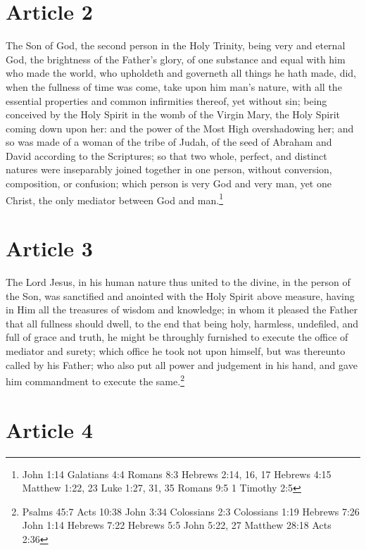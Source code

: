 \documentclass[12pt,letterpaper]{book}
\begin{document}
\section{Article 2}

The Son of God, the second person in the Holy Trinity, being very and eternal God, the brightness of the Father's glory, of one substance and equal with him who made the world, who upholdeth and governeth all things he hath made, did, when the fullness of time was come, take upon him man's nature, with all the essential properties and common infirmities thereof, yet without sin; being conceived by the Holy Spirit in the womb of the Virgin Mary, the Holy Spirit coming down upon her: and the power of the Most High overshadowing her; and so was made of a woman of the tribe of Judah, of the seed of Abraham and David according to the Scriptures; so that two whole, perfect, and distinct natures were inseparably joined together in one person, without conversion, composition, or confusion; which person is very God and very man, yet one Christ, the only mediator between God and man.\footnote{John 1:14 Galatians 4:4 Romans 8:3 Hebrews 2:14, 16, 17 Hebrews 4:15 Matthew 1:22, 23 Luke 1:27, 31, 35 Romans 9:5 1 Timothy 2:5}

\section{Article 3}

The Lord Jesus, in his human nature thus united to the divine, in the person of the Son, was sanctified and anointed with the Holy Spirit above measure, having in Him all the treasures of wisdom and knowledge; in whom it pleased the Father that all fullness should dwell, to the end that being holy, harmless, undefiled, and full of grace and truth, he might be throughly furnished to execute the office of mediator and surety; which office he took not upon himself, but was thereunto called by his Father; who also put all power and judgement in his hand, and gave him commandment to execute the same.\footnote{Psalms 45:7 Acts 10:38 John 3:34 Colossians 2:3 Colossians 1:19 Hebrews 7:26 John 1:14 Hebrews 7:22 Hebrews 5:5 John 5:22, 27 Matthew 28:18 Acts 2:36}

\section{Article 4}
\end{document}

